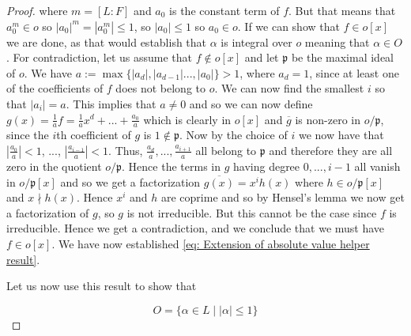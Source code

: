 \documentclass{article}
\newcommand{\mfrak}[1]{\mathfrak{#1}}
\numberwithin{equation}{section}
\begin{document}
\begin{proof}
    where $m = [L : F]$ and $a_0$ is the constant term of $f$. But that means that $a_0^m \in o$ so $|a_0|^m = |a_0^m| \leq 1$, so $|a_0| \leq 1$ so $a_0 \in o$. If we can show that $f \in o[x]$ we are done, as that would establish that $\alpha$ is integral over $o$ meaning that $\alpha \in O$. For contradiction, let us assume that $f \notin o[x]$ and let $\mfrak p$ be the maximal ideal of $o$. We have $a := \max\{|a_d|, |a_{d-1}| ..., |a_0| \} > 1$, where $a_d = 1$, since at least one of the coefficients of $f$ does not belong to $o$. We can now find the smallest $i$ so that $|a_i| = a$. This implies that $a \neq 0$ and so we can now define $g(x) = \frac{1}{a}f = \frac{1}{a}x^d + ... + \frac{a_0}{a}$ which is clearly in $o[x]$ and $\overline g$ is non-zero in $o/\mfrak p$, since the $i$th coefficient of $g$ is $1 \notin \mfrak p$. Now by the choice of $i$ we now have that $|\frac{a_0}{a}| < 1$, ..., $|\frac{a_{i-1}}{a}| < 1$. Thus, $\frac{a_d}{a}, ..., \frac{a_{i+1}}{a}$ all belong to $\mfrak p$ and therefore they are all zero in the quotient $o/\mfrak p$. Hence the terms in $g$ having degree $0, ..., i-1$ all vanish in $o/\mfrak p[x]$ and so we get a factorization $\overline {g(x)} = x^i h(x)$ where $h \in o/\mfrak p[x]$ and $x \nmid h(x)$. Hence $x^i$ and $h$ are coprime and so by Hensel's lemma we now get a factorization of $g$, so $g$ is not irreducible. But this cannot be the case since $f$ is irreducible. Hence we get a contradiction, and we conclude that we must have $f \in o[x]$. We have now established \cref{eq: Extension of absolute value helper result}.




    Let us now use this result to show that

    $$O = \{\alpha \in L \mid |\alpha| \leq 1  \}$$


\end{proof}
\end{document}
